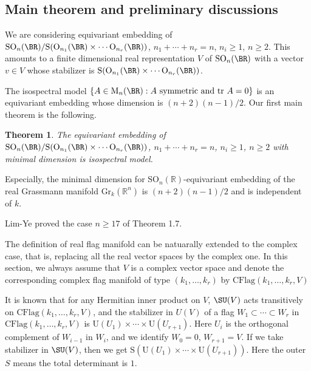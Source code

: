 \documentclass[a4paper]{amsart}
\newcommand{\RM}{{\mathrm {M}}} \newcommand{\RN}{{\mathrm {N}}}
\newcommand{\RO}{{\mathrm {O}}} \newcommand{\RP}{{\mathrm {P}}}
\newcommand{\RS}{{\mathrm {S}}} \newcommand{\RT}{{\mathrm {T}}}
\newcommand{\RU}{{\mathrm {U}}} \newcommand{\RV}{{\mathrm {V}}}
\newcommand{\CFlag}{\mathrm{CFlag}}
\newcommand{\SO}{{\mathrm{SO}}}\newcommand{\so}{\mathfrak{so}}
\newcommand{\tr}{{\mathrm{tr}}}\newcommand{\tor}{{\mathrm{tor}}}
\theoremstyle{plain}
\newtheorem{thm}{Theorem}[section] \newtheorem{cor}[thm]{Corollary}
\theoremstyle{remark} \newtheorem{remark}[thm]{Remark}
\theoremstyle{remark} \newtheorem{exercise}{Exercise}
\theoremstyle{remark} \newtheorem{example}{Example}
\numberwithin{equation}{section}
\begin{document}
\subsection{Main theorem and preliminary discussions}

We are considering equivariant embedding of $\SO_n(\BR)/\RS(\RO_{n_1}(\BR)\times\cdots\RO_{n_r}(\BR))$, $n_1+\cdots+n_r=n$, $n_i\geqslant 1$, $n\geqslant 2$. This amounts to a finite dimensional real representation $V$ of $\SO_n(\BR)$ with a vector $v\in V$ whose stabilizer is $\RS(\RO_{n_1}(\BR)\times\cdots\RO_{n_r}(\BR))$.

The isospectral model $\{A\in\RM_n(\BR): A\text{ symmetric and } \tr\ A=0\}$ is an equivariant embedding whose dimension is $(n+2)(n-1)/2$. %
Our first main theorem is the following.

\begin{thm}\label{orth-flag-min}
    The equivariant embedding of $\SO_n(\BR)/\RS(\RO_{n_1}(\BR)\times\cdots\RO_{n_r}(\BR))$, $n_1+\cdots+n_r=n$, $n_i\geqslant 1$, $n\geqslant 2$ with minimal dimension is isospectral model.
\end{thm}

Especially, the minimal dimension for $\text{SO}_n(\mathbb{R})$-equivariant embedding of the real Grassmann manifold $\text{Gr}_k(\mathbb{R}^n)$ is $(n+2)(n-1)/2$ and is independent of $k$.

Lim-Ye \cite{LY} proved the case $n\ge 17$ of Theorem 1.7.

The definition of real flag manifold can be natuarally extended to the complex case, that is, replacing all the real vector spaces by the complex one. In this section, we always assume that $V$ is a complex vector space and denote the corresponding complex flag manifold of type $(k_1,\dots,k_r)$ by $\CFlag(k_1,\dots,k_r,V)$

It is known that for any Hermitian inner product on $V$, $\SU(V)$ acts transitively on $\CFlag(k_1,\ldots,k_r,V)$, and the stabilizer in $U(V)$ of a flag $W_1\subset\cdots\subset W_r$ in $\CFlag(k_1,\ldots,k_r,V)$ is $\RU(U_1)\times\cdots\times\RU(U_{r+1})$. Here $U_i$ is the orthogonal complement of $W_{i-1}$ in $W_i$, and we identify $W_0=0$, $W_{r+1}=V$. If we take stabilizer in $\SU(V)$, then we get $\RS(\RU(U_1)\times\cdots\times\RU(U_{r+1}))$. Here the outer $S$ means the total determinant is $1$.
\end{document}
